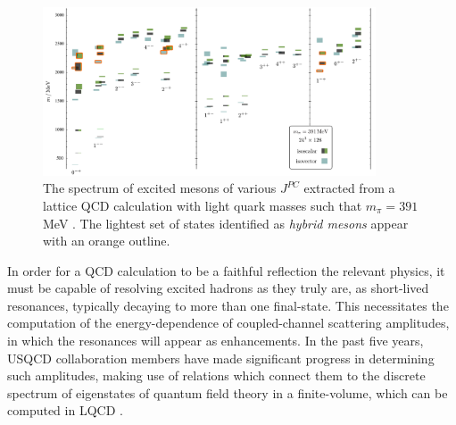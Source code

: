 \begin{figure}
\includegraphics[width=0.88\textwidth]{figures/isoscalar}
\caption{The spectrum of excited mesons of various $J^{PC}$ extracted from a lattice QCD calculation with light quark masses such that $m_\pi = 391$ MeV \cite{Dudek:2013yja}. The lightest set of states identified as \emph{hybrid mesons} appear with an orange outline.}
\label{spectrum}
\end{figure}

In order for a QCD calculation to be a faithful reflection the relevant physics, it must be capable of resolving excited hadrons as they truly are, as short-lived resonances, typically decaying to more than one final-state. This necessitates the computation of the energy-dependence of coupled-channel scattering amplitudes, in which the resonances will appear as enhancements. In the past five years, USQCD collaboration members have made significant progress in determining such amplitudes, making use of relations which connect them to the discrete spectrum of eigenstates of quantum field theory in a finite-volume, which can be computed in LQCD
\cite{Luscher:1986pf,Luscher:1990ux,Rummukainen:1995vs,Feng:2004ua,He:2005ey,Bedaque:2004kc,Liu:2005kr,Kim:2005gf,Christ:2005gi,Lage:2009zv,Bernard:2010fp,Fu:2011xz,Leskovec:2012gb,Briceno:2012yi,Hansen:2012tf,Guo:2012hv,Li:2012bi,Briceno:2013hya,Briceno:2014oea}.

